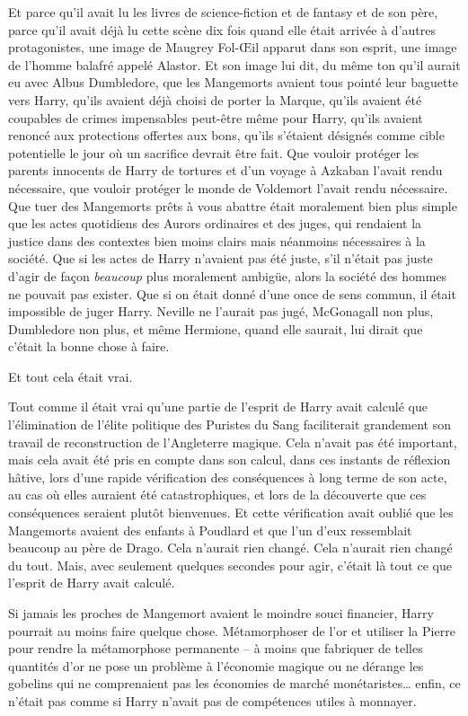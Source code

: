 Et parce qu'il avait lu les livres de science-fiction et de fantasy et de son père, parce qu'il avait déjà lu cette scène dix fois quand elle était arrivée à d'autres protagonistes, une image de Maugrey Fol-Œil apparut dans son esprit, une image de l'homme balafré appelé Alastor.
Et son image lui dit, du même ton qu'il aurait eu avec Albus Dumbledore, que les Mangemorts avaient tous pointé leur baguette vers Harry, qu'ils avaient déjà choisi de porter la Marque, qu'ils avaient été coupables de crimes impensables peut-être même pour Harry, qu'ils avaient renoncé aux protections offertes aux bons, qu'ils s'étaient désignés comme cible potentielle le jour où un sacrifice devrait être fait.
Que vouloir protéger les parents innocents de Harry de tortures et d'un voyage à Azkaban l'avait rendu nécessaire, que vouloir protéger le monde de Voldemort l'avait rendu nécessaire.
Que tuer des Mangemorts prêts à vous abattre était moralement bien plus simple que les actes quotidiens des Aurors ordinaires et des juges, qui rendaient la justice dans des contextes bien moins clairs mais néanmoins nécessaires à la société.
Que si les actes de Harry n'avaient pas été juste, s'il n'était pas juste d'agir de façon \emph{beaucoup} plus moralement ambigüe, alors la société des hommes ne pouvait pas exister.
Que si on était donné d'une once de sens commun, il était impossible de juger Harry.
Neville ne l'aurait pas jugé, McGonagall non plus, Dumbledore non plus, et même Hermione, quand elle saurait, lui dirait que c'était la bonne chose à faire.

Et tout cela était vrai.

Tout comme il était vrai qu'une partie de l'esprit de Harry avait calculé que l'élimination de l'élite politique des Puristes du Sang faciliterait grandement son travail de reconstruction de l'Angleterre magique.
Cela n'avait pas été important, mais cela avait été pris en compte dans son calcul, dans ces instants de réflexion hâtive, lors d'une rapide vérification des conséquences à long terme de son acte, au cas où elles auraient été catastrophiques, et lors de la découverte que ces conséquences seraient plutôt bienvenues.
Et cette vérification avait oublié que les Mangemorts avaient des enfants à Poudlard et que l'un d'eux ressemblait beaucoup au père de Drago.
Cela n'aurait rien changé.
Cela n'aurait rien changé du tout.
Mais, avec seulement quelques secondes pour agir, c'était là tout ce que l'esprit de Harry avait calculé.

Si jamais les proches de Mangemort avaient le moindre souci financier, Harry pourrait au moins faire quelque chose.
Métamorphoser de l'or et utiliser la Pierre pour rendre la métamorphose permanente -- à moins que fabriquer de telles quantités d'or ne pose un problème à l'économie magique ou ne dérange les gobelins qui ne comprenaient pas les économies de marché monétaristes… enfin, ce n'était pas comme si Harry n'avait pas de compétences utiles à monnayer.

